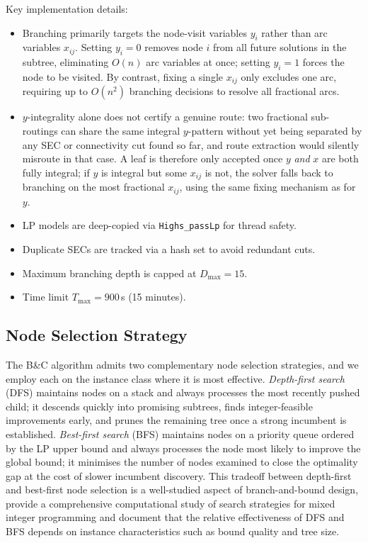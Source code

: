 \documentclass[11pt,a4paper]{article}
\begin{document}
Key implementation details:
\begin{itemize}[nosep]
  \item Branching primarily targets the node-visit variables $y_i$ rather than arc variables $x_{ij}$.
        Setting $y_i = 0$ removes node $i$ from all future solutions in the subtree, eliminating $O(n)$ arc variables at once; setting $y_i = 1$ forces the node to be visited.
        By contrast, fixing a single $x_{ij}$ only excludes one arc, requiring up to $O(n^2)$ branching decisions to resolve all fractional arcs.
  \item $y$-integrality alone does not certify a genuine route: two fractional sub-routings can share the same integral $y$-pattern without yet being separated by any SEC or connectivity cut found so far, and route extraction would silently misroute in that case. A leaf is therefore only accepted once $y$ \emph{and} $x$ are both fully integral; if $y$ is integral but some $x_{ij}$ is not, the solver falls back to branching on the most fractional $x_{ij}$, using the same fixing mechanism as for $y$.
  \item LP models are deep-copied via \texttt{Highs\_passLp} for thread safety.
  \item Duplicate SECs are tracked via a hash set to avoid redundant cuts.
  \item Maximum branching depth is capped at $D_{\max} = 15$.
  \item Time limit $T_{\max} = 900$\,s (15 minutes).
\end{itemize}

\subsection{Node Selection Strategy}
\label{sec:node-selection}

The B\&C algorithm admits two complementary node selection strategies, and we employ each on the instance class where it is most effective.
\emph{Depth-first search} (DFS) maintains nodes on a stack and always processes the most recently pushed child; it descends quickly into promising subtrees, finds integer-feasible improvements early, and prunes the remaining tree once a strong incumbent is established.
\emph{Best-first search} (BFS) maintains nodes on a priority queue ordered by the LP upper bound and always processes the node most likely to improve the global bound; it minimises the number of nodes examined to close the optimality gap at the cost of slower incumbent discovery.
This tradeoff between depth-first and best-first node selection is a well-studied aspect of branch-and-bound design, \citet{linderoth1999computational} provide a comprehensive computational study of search strategies for mixed integer programming and document that the relative effectiveness of DFS and BFS depends on instance characteristics such as bound quality and tree size.
\end{document}
